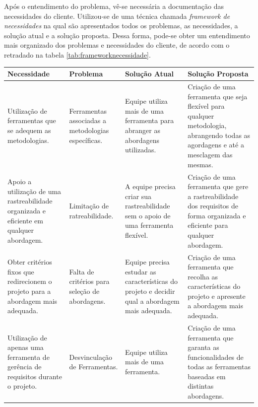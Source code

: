 Após o entendimento do problema, vê-se necessária a documentação das necessidades do cliente. Utilizou-se de uma técnica chamada \textit{framework de necessidades} na qual são apresentados todos os problemas, as necessidades, a solução atual e a solução proposta. Dessa forma, pode-se obter um entendimento mais organizado dos problemas e necessidades do cliente, de acordo com o retradado na tabela \ref{tab:frameworknecessidade}.

\begin{table}[H]
\centering
\begin{tabular}{|p{5cm}|p{3cm}|p{3cm}|p{5cm}|}

\hline
\textbf{Necessidade} &
\textbf{Problema} &
\textbf{Solução Atual} &
\textbf{Solução Proposta}
\\ \hline
Utilização de ferramentas que se adequem as metodologias. &
Ferramentas associadas a metodologias específicas. &
Equipe utiliza mais de uma ferramenta para abranger as abordagens utilizadas. &
Criação de uma ferramenta que seja flexível para qualquer metodologia, abrangendo todas as agordagens e até a mesclagem das mesmas.
\\ \hline
Apoio a utilização de uma rastreabilidade organizada e eficiente em qualquer abordagem. &
Limitação de ratreabilidade. &
A equipe precisa criar sua rastreabilidade sem o apoio de uma ferramenta flexível. &
Criação de uma ferramenta que gere a rastreabilidade dos requisitos de forma organizada e eficiente para qualquer abordagem.
\\ \hline
Obter critérios fixos que redirecionem o projeto para a abordagem mais adequada. &
Falta de critérios para seleção de abordagens. &
Equipe precisa estudar as características do projeto e decidir qual a abordagem mais adequada. &
Criação de uma ferramenta que recolha as características do projeto e apresente a abordagem mais adequada.
\\ \hline
Utilização de apenas uma ferramenta de gerência de requisitos durante o projeto. &
Desvinculação de Ferramentas. &
Equipe utiliza mais de uma ferramenta. &
Criação de uma ferramenta que garanta as funcionalidades de todas as ferramentas baseadas em distintas abordagens. 

\end{tabular}
\end{table}
